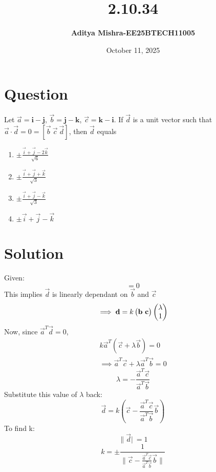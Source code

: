 \documentclass[14pt]{extarticle}
\title{\textbf{2.10.34}}
\author{\textbf{Aditya Mishra-EE25BTECH11005}}
\date{October 11, 2025}
\begin{document}
\maketitle

\section*{Question}
Let $\vec{a} = \mathbf{i} - \mathbf{j}$, $\vec{b} = \mathbf{j} - \mathbf{k}$, $\vec{c} = \mathbf{k} - \mathbf{i}$.  
If $\vec{d}$ is a unit vector such that $\vec{a} \cdot \vec{d} = 0 = [\vec{b}~\vec{c}~\vec{d}]$,  
then $\vec{d}$ equals

\begin{multicols}{2}
\begin{enumerate}
    \item $\pm \frac{{\vec{i} + \vec{j} - 2\vec{k}}}{\sqrt{6}}$
    \item $\pm \frac{{\vec{i} + \vec{j} + \vec{k}}}{\sqrt{3}}$
    \item $\pm \frac{{\vec{i} + \vec{j} - \vec{k}}}{\sqrt{3}}$
    \item $\pm {\vec{i} + \vec{j} - \vec{k}}$
\end{enumerate}
\end{multicols}

\section*{Solution}

Given:
\begin{equation}
[\vec{b}~\vec{c}~\vec{d}] = 0
\end{equation}
This implies $\vec{d}$ is linearly dependant on $\vec{b}$ and $\vec{c}$
\begin{equation}
\implies \vec{d} = k\myvec{\vec{b} \ \vec{c}}\myvec{\lambda \\ 1}
\end{equation}
Now, since $\vec{a}^T \vec{d} = 0$,
\begin{align}
k\vec{a}^T (\vec{c} + \lambda \vec{b}) = 0 \\
\implies \vec{a}^T \vec{c} + \lambda \vec{a}^T \vec{b} = 0
\end{align}
\begin{equation}
\lambda = -\frac{\vec{a}^T \vec{c}}{\vec{a}^T \vec{b}}
\end{equation}
Substitute this value of $\lambda$ back:
\begin{equation}
\vec{d} = k(\vec{c} - \frac{\vec{a}^T \vec{c}}{\vec{a}^T \vec{b}} \vec{b})
\end{equation}
To find k:
\begin{equation}
\|\vec{d}|\ = 1
\end{equation}
\begin{equation}
k = \pm \frac{1}{\|\vec{c} - \frac{\vec{a}^T \vec{c}}{\vec{a}^T \vec{b}} \vec{b}\|}
\end{equation}
\end{document}
